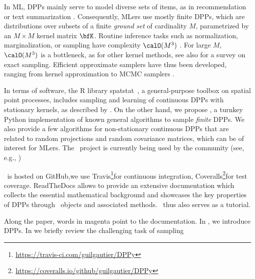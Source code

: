 \documentclass[twoside,11pt]{article}
\begin{document}
    In ML, DPPs mainly serve to model diverse sets of items, as in recommendation \citep{KaDeKo16, GaPaKo16} or text summarization \citep{DuBa18}.
    Consequently, MLers  use mostly finite DPPs, which are distributions over subsets of a finite \emph{ground set} of cardinality $M$, parametrized by an $M\times M$ kernel matrix $\bfK$.
    Routine inference tasks such as normalization, marginalization, or sampling have complexity $\calO(M^3)$ \citep{Gil14}.
    For large $M$, $\calO(M^3)$ is a bottleneck, as for other kernel methods, see also \citet{TrBaAm18} for a survey on exact sampling.
    Efficient approximate samplers have thus been developed, ranging from kernel approximation \citep{AKFT13} to MCMC samplers \citep{AnGhRe16, LiJeSr16c, GaBaVa17}.

    In terms of software, the R library \textsf{spatstat}\ \citep{BaTu05}, a general-purpose toolbox on spatial point processes, includes sampling and learning of continuous DPPs with stationary kernels, as described by \citet{LaMoRu15}.
    On the other hand, we propose \DPPy, a turnkey Python implementation of known general algorithms to sample \emph{finite} DPPs.
    We also provide a few algorithms for non-stationary continuous DPPs that are related to random projections and random covariance matrices, which can be of interest for MLers.
    The \DPPy\ project is currently being used by the community (see, e.g., \citealp{BuRaWi19,Kam18,Pou19,DeCaVa19,GaBaVa19})
    \setcounter{footnote}{3}

    \DPPy\ is hosted on GitHub,\!we use \setcounter{footnote}{5}Travis\!\footnote{\url{https://travis-ci.com/guilgautier/DPPy}}for continuous integration, Coveralls\!\footnote{\url{https://coveralls.io/github/guilgautier/DPPy}}for test coverage.
    ReadTheDocs \!allows to provide an extensive documentation which collects the essential mathematical background and showcases the key properties of DPPs through \DPPy\ objects and associated methods.
    \DPPy\ thus also serves as a tutorial.

    Along the paper, words in magenta point to the documentation.
    In , we introduce DPPs. In  we briefly review the challenging task of sampling


\end{document}
